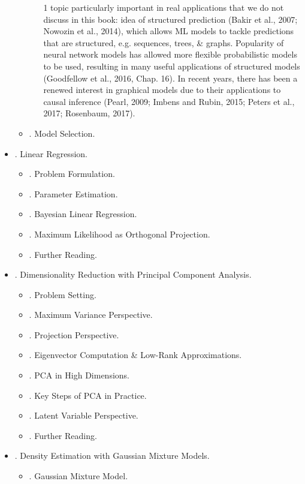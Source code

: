 \documentclass{article}
\begin{document}
\begin{itemize}
\begin{itemize}
\begin{itemize}
			1 topic particularly important in real applications that we do not discuss in this book: idea of structured prediction (Bakir et al., 2007; Nowozin et al., 2014), which allows ML models to tackle predictions that are structured, e.g. sequences, trees, \& graphs. Popularity of neural network models has allowed more flexible probabilistic models to be used, resulting in many useful applications of structured models (Goodfellow et al., 2016, Chap. 16). In recent years, there has been a renewed interest in graphical models due to their applications to causal inference (Pearl, 2009; Imbens and Rubin, 2015; Peters et al., 2017; Rosenbaum, 2017).
		\end{itemize}
		\item {. Model Selection.}
	\end{itemize}
	\item {. Linear Regression.}
	\begin{itemize}
		\item {. Problem Formulation.}
		\item {. Parameter Estimation.}
		\item {. Bayesian Linear Regression.}
		\item {. Maximum Likelihood as Orthogonal Projection.}
		\item {. Further Reading.}
	\end{itemize}
	\item {. Dimensionality Reduction with Principal Component Analysis.}
	\begin{itemize}
		\item {. Problem Setting.}
		\item {. Maximum Variance Perspective.}
		\item {. Projection Perspective.}
		\item {. Eigenvector Computation \& Low-Rank Approximations.}
		\item {. PCA in High Dimensions.}
		\item {. Key Steps of PCA in Practice.}
		\item {. Latent Variable Perspective.}
		\item {. Further Reading.}
	\end{itemize}
	\item {. Density Estimation with Gaussian Mixture Models.}
	\begin{itemize}
		\item {. Gaussian Mixture Model.}

\end{itemize}
\end{itemize}
\end{document}
